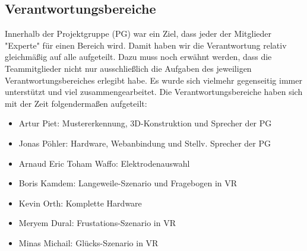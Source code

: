 \begin{figure}[h]
\end{figure} 



\subsection{Verantwortungsbereiche}
Innerhalb der Projektgruppe (PG) war ein Ziel, dass jeder der Mitglieder "Experte" für einen Bereich wird. Damit haben wir die Verantwortung relativ gleichmäßig auf alle aufgeteilt. Dazu muss noch erwähnt werden, dass die Teammitglieder nicht nur ausschließlich die Aufgaben des jeweiligen Verantwortungsbereiches erlegibt habe. Es wurde sich vielmehr gegenseitig immer unterstützt und viel zusammengearbeitet. Die Verantwortungsbereiche haben sich mit der Zeit folgendermaßen aufgeteilt:

\begin{itemize} \setlength\itemsep{-0.15cm}
  \item Artur Piet: Mustererkennung, 3D-Konstruktion und Sprecher der PG
  \item Jonas Pöhler: Hardware, Webanbindung und Stellv. Sprecher der PG
  \item Arnaud Eric Toham Waffo: Elektrodenauswahl
  \item Boris Kamdem: Langeweile-Szenario und Fragebogen in VR
  \item Kevin Orth: Komplette Hardware
  \item Meryem Dural: Frustations-Szenario in VR
  \item Minas Michail: Glücks-Szenario in VR
\end{itemize}




